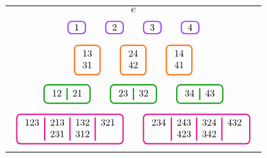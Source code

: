 \begin{example}
\begin{center} \begin{figure}[ht!] \centering \begin{tabular}{c}
$$\boxed{~e~}$$ \\ \\
%
$\ds{\begin{array}{ccccccc}
\boxp{~1~} && \boxp{~2~} && \boxp{~3~} && \boxp{~4~}
\end{array}}$ \\ \\
%
$\ds{\begin{array}{ccccc}
\boxor{\begin{array}{c} 13 \\ 31 \end{array}} &&
\boxor{\begin{array}{c} 24 \\ 42 \end{array}} &&
\boxor{\begin{array}{c} 14 \\ 41 \end{array}}
\end{array}}$ \\ \\
%
${\ds 
\setlength{\arrayrulewidth}{1.25pt}
\begin{array}{ccccc}
\boxgr{
\begin{array}{c|c}\arrayrulecolor{ggreen}
12 & 21 \end{array}} 
&&
\boxgr{
\begin{array}{c|c}\arrayrulecolor{ggreen}
23 & 32 \end{array}}
&&
\boxgr{ 
\begin{array}{c|c}\arrayrulecolor{ggreen}
34 & 43 \end{array}}
\end{array}}$ \\ \\
%
${\ds
\setlength{\arrayrulewidth}{1.25pt}
\begin{array}{ccc}
\boxm{
\begin{array}{c|c|c|c}\arrayrulecolor{magenta}
123 & 213 & 132 & 321 \\
    & 231 & 312 &
\end{array}} 
& &
\boxm{
\begin{array}{c|c|c|c}\arrayrulecolor{magenta}
234 & 243 & 324 & 432 \\
    & 423 & 342 &
\end{array}}
\end{array}}$ \\ \\

\end{tabular}
\end{figure}
\end{center}
\end{example}
